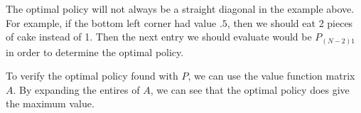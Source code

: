 \begin{warn}
The optimal policy will not always be a straight diagonal in the example above.
For example, if the bottom left corner had value $.5$, then we should eat 2 pieces of cake instead of 1.
Then the next entry we should evaluate would be $P_{(N-2)1}$ in order to determine the optimal policy.
\end{warn}

 To verify the optimal policy found with $P$, we can use the value function matrix $A$.
By expanding the entires of $A$, we can see that the optimal policy does give the maximum value.


\begin{center}
\end{center}

